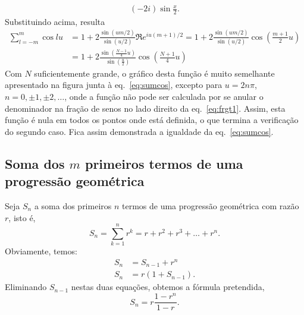 {\begin{align*}
(-2i)\sin\frac{x}{2}.
\end{align*}
Substituindo acima, resulta
\begin{align}
\sum_{l=-m}^m\cos lu &= 1+2\frac{\sin(um/2)}{\sin(u/2)}\Re e^{iu(m+1)/2}=
1+2\frac{\sin(um/2)}{\sin(u/2)}\cos\left(\frac{m+1}{2}u\right)\nonumber\\
&=1+ 2\frac{\sin\left(\frac{N-1}{4}u\right)}{\sin\left(\frac{u}{2}\right)}
\cos\left(\frac{N+1}{4}u\right)\label{eq:frgt1}
\end{align}
Com $N$ suficientemente grande, o gráfico desta função é muito semelhante
apresentado na figura junta à eq.~\eqref{eq:sumcos}, excepto para $u=2n\pi$,
$n=0,\pm1,\pm2,\ldots$, onde a função não pode ser calculada por se anular o
denominador na fração de senos no lado direito da eq.~\eqref{eq:frgt1}. Assim,
esta função é nula em todos os pontos onde está definida, o que termina a
verificação do segundo caso.  Fica assim demonstrada a igualdade da
eq.~\eqref{eq:sumcos}.
\subsection*{Soma dos $m$ primeiros termos de uma progressão geométrica}
Seja $S_n$ a soma dos primeiros $n$ termos de uma progressão geométrica com
razão $r$, isto é,
\begin{equation*}
S_n=\sum_{k=1}^nr^k=r+r^2+r^3+\ldots+r^n.
\end{equation*}
Obviamente, temos:
\begin{align*}
S_{n}&=S_{n-1}+r^{n}\\
S_{n}&=r(1+S_{n-1}).
\end{align*}
Eliminando $S_{n-1}$ nestas duas equações, obtemos a fórmula pretendida,
\begin{equation*}
S_n=r\frac{1-r^n}{1-r}.
\end{equation*}
}
